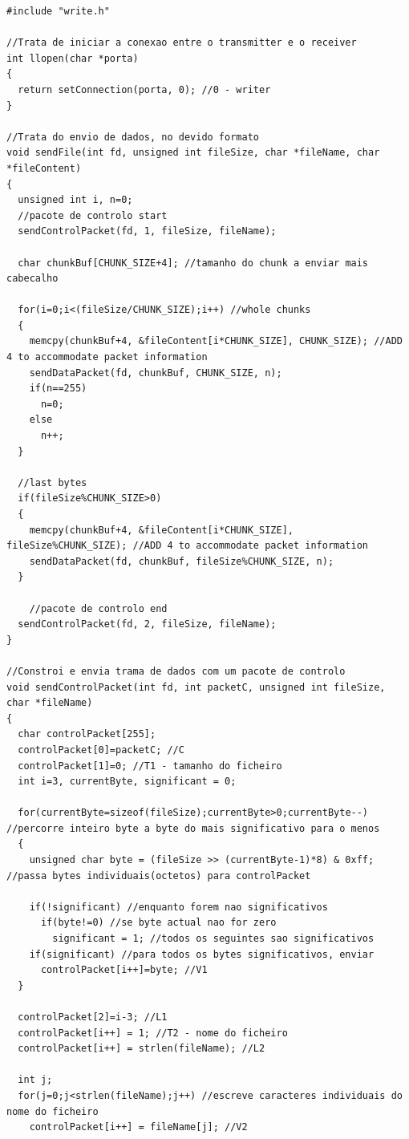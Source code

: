 \documentclass[a4paper,11pt]{article}
\begin{document}
\lstset{language=C,
		showstringspaces=false,
		frame=tb,
		caption=Write.c}
\begin{lstlisting}
#include "write.h"

//Trata de iniciar a conexao entre o transmitter e o receiver
int llopen(char *porta)
{
  return setConnection(porta, 0); //0 - writer
}

//Trata do envio de dados, no devido formato 
void sendFile(int fd, unsigned int fileSize, char *fileName, char *fileContent)
{
  unsigned int i, n=0;
  //pacote de controlo start
  sendControlPacket(fd, 1, fileSize, fileName);
  
  char chunkBuf[CHUNK_SIZE+4]; //tamanho do chunk a enviar mais cabecalho
  
  for(i=0;i<(fileSize/CHUNK_SIZE);i++) //whole chunks
  {
    memcpy(chunkBuf+4, &fileContent[i*CHUNK_SIZE], CHUNK_SIZE); //ADD 4 to accommodate packet information
    sendDataPacket(fd, chunkBuf, CHUNK_SIZE, n);
    if(n==255)
      n=0;
    else
      n++;
  }
  
  //last bytes
  if(fileSize%CHUNK_SIZE>0)
  {
    memcpy(chunkBuf+4, &fileContent[i*CHUNK_SIZE], fileSize%CHUNK_SIZE); //ADD 4 to accommodate packet information
    sendDataPacket(fd, chunkBuf, fileSize%CHUNK_SIZE, n);
  }
    
    //pacote de controlo end
  sendControlPacket(fd, 2, fileSize, fileName);
}

//Constroi e envia trama de dados com um pacote de controlo
void sendControlPacket(int fd, int packetC, unsigned int fileSize, char *fileName)
{
  char controlPacket[255];
  controlPacket[0]=packetC; //C
  controlPacket[1]=0; //T1 - tamanho do ficheiro
  int i=3, currentByte, significant = 0;
  
  for(currentByte=sizeof(fileSize);currentByte>0;currentByte--) //percorre inteiro byte a byte do mais significativo para o menos
  {
    unsigned char byte = (fileSize >> (currentByte-1)*8) & 0xff; //passa bytes individuais(octetos) para controlPacket
    
    if(!significant) //enquanto forem nao significativos
      if(byte!=0) //se byte actual nao for zero
        significant = 1; //todos os seguintes sao significativos
    if(significant) //para todos os bytes significativos, enviar
      controlPacket[i++]=byte; //V1
  }
  
  controlPacket[2]=i-3; //L1
  controlPacket[i++] = 1; //T2 - nome do ficheiro
  controlPacket[i++] = strlen(fileName); //L2
  
  int j;  
  for(j=0;j<strlen(fileName);j++) //escreve caracteres individuais do nome do ficheiro
    controlPacket[i++] = fileName[j]; //V2
    

\end{lstlisting}
\end{document}
